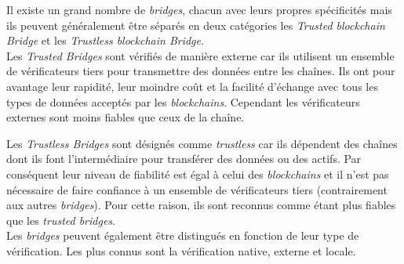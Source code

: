 Il existe un grand nombre de \textit{bridges}, chacun avec leurs propres spécificités mais ils peuvent généralement être séparés en deux catégories les \textit{Trusted \gls{blockchain} Bridge} et les \textit{Trustless \gls{blockchain} Bridge}. \\


Les \textit{Trusted Bridges} sont vérifiés de manière externe car ils utilisent un ensemble de \gls{vérificateur}s tiers pour transmettre des données entre les chaînes. Ils ont pour avantage leur rapidité, leur moindre coût et la facilité d'échange avec tous les types de données acceptés par les \textit{\gls{blockchain}s}. Cependant les \gls{vérificateur}s externes sont moins fiables que ceux de la chaîne.\cite{EthereumBridges}

Les \textit{Trustless Bridges} sont désignés comme \textit{trustless} car ils dépendent des chaînes dont ils font l’intermédiaire pour transférer des données ou des \gls{actif}s. Par conséquent leur niveau de fiabilité est égal à celui des \textit{\gls{blockchain}s} et il n’est pas nécessaire de faire confiance à un ensemble de \gls{vérificateur}s tiers (contrairement aux autres \textit{bridges}). Pour cette raison, ils sont reconnus comme étant plus fiables que les \textit{trusted bridges}.\cite{EthereumBridges}\\


 Les \textit{bridges} peuvent également être distingués en fonction de leur type de vérification. Les plus connus sont la vérification native, externe et locale.\cite{InteroperabilityBhuptani} \\

